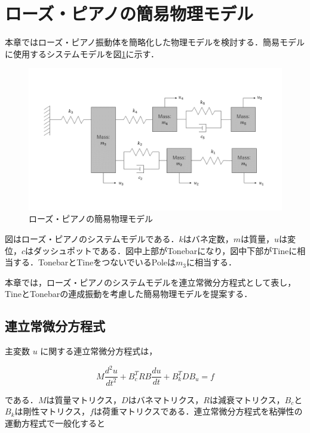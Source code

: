 \section{ローズ・ピアノの簡易物理モデル}

本章ではローズ・ピアノ振動体を簡略化した物理モデルを検討する．簡易モデルに使用するシステムモデルを図\ref{fig:簡易モデル}に示す．

\begin{figure}
    \centering
    \includegraphics[width=15cm]{img/system-model.png}
    \caption{ローズ・ピアノの簡易物理モデル}
    \label{fig:簡易モデル}
\end{figure}

図はローズ・ピアノのシステムモデルである．$k$はバネ定数，$m$は質量，$u$は変位，$c$はダッシュポットである．図中上部がTonebarになり，図中下部がTineに相当する．TonebarとTineをつないでいるPoleは$m_3$に相当する．

本章では，ローズ・ピアノのシステムモデルを連立常微分方程式として表し，TineとTonebarの連成振動を考慮した簡易物理モデルを提案する．



\subsection{連立常微分方程式}

主変数 $u$ に関する連立常微分方程式は，

\begin{equation}
    M \frac{d^2 u}{dt^2} + B_c^T R B \frac{du}{dt} + B_k^T D B_u = f    
\end{equation}

である．$M$は質量マトリクス，$D$はバネマトリクス，$R$は減衰マトリクス，$B_c$と$B_k$は剛性マトリクス，$f$は荷重マトリクスである．連立常微分方程式を粘弾性の運動方程式で一般化すると

